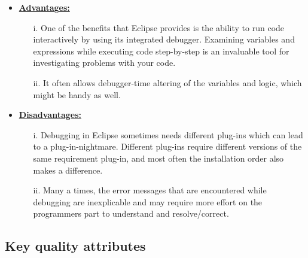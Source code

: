 \documentclass[12pt]{report}
\begin{document}
\begin{itemize}
\item \textbf{\underline{Advantages:}}
	\begin{enumerate}
	\item[i.] One of the benefits that Eclipse provides is the ability to run code interactively by using its integrated debugger. Examining variables and expressions while executing code step-by-step is an invaluable tool for investigating problems with your code.
	\item[ii.] It often allows debugger-time altering of the variables and logic, which might be handy as well.
	\end{enumerate}
\item\textbf{\underline{Disadvantages:}}
	\begin{enumerate}
	\item[i.] Debugging in Eclipse sometimes needs different plug-ins which can lead to a plug-in-nightmare. Different plug-ins require different versions of the same requirement plug-in, and most often the installation order also makes a difference.
	\item[ii.] Many a times, the error messages that are encountered while debugging are inexplicable and may require more effort on the programmers part to understand and resolve/correct.\pagebreak
	\end{enumerate}
\end{itemize}

\subsection{Key quality attributes}
\end{document}
